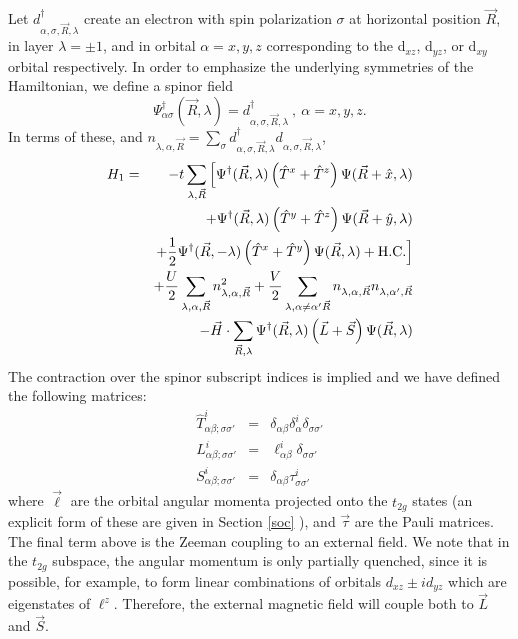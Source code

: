 \documentclass[prb,aps,amssymb,showpacs,twocolumn,amsmath,floatfix]{revtex4}
\def\ba{\begin{eqnarray}}
\def\ea{\end{eqnarray}}
\begin{document}
 
 Let
$d^\dagger_{\alpha, \sigma,  {\vec R}, \lambda}$ create an electron with spin polarization $\sigma$ 
 at horizontal position $\vec{R}$, in layer $\lambda = \pm 1$, and in orbital $\alpha=x,y,z$ 
 corresponding to the d$_{xz}$,  
 d$_{yz}$, or  d$_{xy}$ orbital respectively.  
In order to emphasize the underlying symmetries of the 
 Hamiltonian, we define
  a spinor field 
  \begin{equation}
  \Psi^{\dagger}_{\alpha \sigma}(\vec{R}, \lambda)= d^{\dagger}_{\alpha , \sigma , {\vec R} , \lambda} \ , \  \alpha = x,y,z .
  \end{equation}
  In terms of these, and  $n_{\lambda,\alpha,\vec  R}=\sum_{\sigma}d^{\dagger}_{\alpha , \sigma , {\vec R} , \lambda} d_{\alpha , \sigma , {\vec R} , \lambda} $,
\ba
H_1 &=& -t \sum_{\lambda, \vec{R} }  \Big[  \Psi^{\dagger}({\vec R}, \lambda)  \left( \hat{T}^x + \hat{T}^z \right) \Psi({\vec R}+ \hat{x}, \lambda) 
\nonumber \\
&&+ \Psi^{\dagger} ({\vec R}, \lambda)  \left( \hat{T}^y + \hat{T}^z \right) \Psi({\vec R}+ \hat{y}, \lambda)
\nonumber \\
 && + \frac{1}{2} \Psi^{\dagger}({\vec R}, - \lambda) \left( \hat{T}^x + \hat{T}^y \right)   \Psi({\vec R}, \lambda) + {\rm H.C.}  \Big]\nonumber \\
 &&+ \frac U 2 \sum_{\lambda,\alpha, {\vec R}}n_{\lambda,\alpha,\vec  R}^2 + \frac V 2 \sum_{\lambda,\alpha\neq \alpha^\prime {\vec R}}n_{\lambda,\alpha,\vec  R}n_{\lambda,\alpha^\prime,\vec  R} \nonumber \\
 &&-  \vec{H} \cdot \sum_{{\vec R}, \lambda} \Psi^{\dagger}({\vec R}, \lambda) \left( \vec{L} +  \vec{S} \right)  \Psi({\vec R}, \lambda) 
\ea
The contraction over the spinor subscript indices is  implied and we have defined the following matrices:
\ba
\hat{T}^i_{\alpha \beta; \sigma \sigma '} &=& \delta_{\alpha \beta} \delta^i_{\alpha} \delta_{\sigma \sigma'} \nonumber \\
{L}^i_{\alpha \beta; \sigma \sigma'} &=& \ell^i_{\alpha \beta} \delta_{\sigma \sigma'} \nonumber \\
{S}^i_{\alpha \beta; \sigma \sigma'} &=& \delta_{\alpha \beta} \tau^i_{\sigma \sigma'}
\ea
where 
$\vec{\ell}$ are the orbital angular momenta projected onto the $t_{2g}$ states (an explicit form of these are given in Section \ref{soc} ), 
and $\vec{\tau}$ 
are the Pauli matrices.  
The final term above is the Zeeman coupling to an external field.  We note that in the $t_{2g}$ subspace, the angular momentum is 
only partially quenched, since it is possible, for example, to form linear combinations of orbitals  $d_{xz} \pm i d_{yz}$ which are 
eigenstates of $\ell^z$.   Therefore, the external magnetic field will couple both to ${\vec L} $ and ${\vec S}$.    
\end{document}
